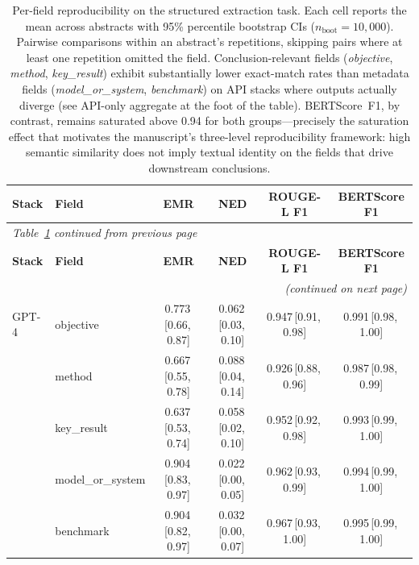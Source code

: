 \documentclass[11pt]{article}
\begin{document}
{\scriptsize
\setlength{\tabcolsep}{4pt}
\setlength{\LTleft}{0pt}
\setlength{\LTright}{0pt}
\begin{longtable}{@{}p{3.2cm}lcccc@{}}
\caption{Per-field reproducibility on the structured extraction task. Each cell reports the mean across abstracts with 95\% percentile bootstrap CIs ($n_{\text{boot}}{=}10{,}000$). Pairwise comparisons within an abstract's repetitions, skipping pairs where at least one repetition omitted the field. Conclusion-relevant fields (\emph{objective}, \emph{method}, \emph{key\_result}) exhibit substantially lower exact-match rates than metadata fields (\emph{model\_or\_system}, \emph{benchmark}) on API stacks where outputs actually diverge (see API-only aggregate at the foot of the table). BERTScore~F1, by contrast, remains saturated above 0.94 for both groups---precisely the saturation effect that motivates the manuscript's three-level reproducibility framework: high semantic similarity does not imply textual identity on the fields that drive downstream conclusions.}\label{tab:per_field_metrics}\\
\toprule
\textbf{Stack} & \textbf{Field} & \textbf{EMR} & \textbf{NED} & \textbf{ROUGE-L F1} & \textbf{BERTScore F1} \\
\midrule
\endfirsthead
\multicolumn{6}{l}{\textit{Table~\ref{tab:per_field_metrics} continued from previous page}}\\
\toprule
\textbf{Stack} & \textbf{Field} & \textbf{EMR} & \textbf{NED} & \textbf{ROUGE-L F1} & \textbf{BERTScore F1} \\
\midrule
\endhead
\midrule
\multicolumn{6}{r}{\textit{(continued on next page)}}\\
\endfoot
\bottomrule
\endlastfoot
  GPT-4 & objective & 0.773\,[0.66,\,0.87] & 0.062\,[0.03,\,0.10] & 0.947\,[0.91,\,0.98] & 0.991\,[0.98,\,1.00] \\
   & method & 0.667\,[0.55,\,0.78] & 0.088\,[0.04,\,0.14] & 0.926\,[0.88,\,0.96] & 0.987\,[0.98,\,0.99] \\
   & key\_result & 0.637\,[0.53,\,0.74] & 0.058\,[0.02,\,0.10] & 0.952\,[0.92,\,0.98] & 0.993\,[0.99,\,1.00] \\
   & model\_or\_system & 0.904\,[0.83,\,0.97] & 0.022\,[0.00,\,0.05] & 0.962\,[0.93,\,0.99] & 0.994\,[0.99,\,1.00] \\
   & benchmark & 0.904\,[0.82,\,0.97] & 0.032\,[0.00,\,0.07] & 0.967\,[0.93,\,1.00] & 0.995\,[0.99,\,1.00] \\

\end{longtable}}
\end{document}
